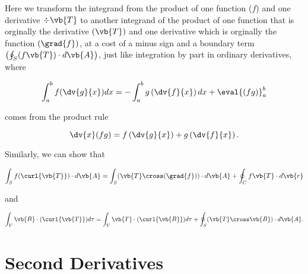 \documentclass[english,a4paper,12pt]{report}
\begin{document}
Here we transform the integrand from the product of one function (\(f\)) and one derivative \(\div{\vb{T}}\) to another integrand of the product of one function that is orginally the derivative \((\vb{T})\) and one derivative which is orginally the function \((\grad{f})\), at a cost of a minus sign and a boundary term \(\left(\oint_{S} (f\vb{T}) \cdot d\vb{A}\right)\), just like integration by part in ordinary derivatives, where
	
\begin{equation} 
	\int_{a}^{b} f(\dv{g}{x})dx = -\int_{a}^{b} g\left(\dv{f}{x}\right)dx + \eval{\left(fg\right)}_a^b 
\end{equation}
	
comes from the product rule
	
\begin{equation} 
	\dv{x}(fg) = f\left(\dv{g}{x}\right) + g\left(\dv{f}{x}\right). 
\end{equation}

Similarly, we can show that 
	
\begin{equation} 
	\int_{S} f(\curl{\vb{T}}) \cdot d\vb{A} = \int_{S} (\vb{T} \cross (\grad{f})) \cdot d\vb{A} + \oint_{C} f\vb{T} \cdot d\vb{r} 
\end{equation}
	
and

\begin{equation} 
	\int_{V} \vb{B} \cdot (\curl{\vb{T}}) d\tau = \int_{V} \vb{T} \cdot (\curl{\vb{B}}) d\tau + \oint_{S} (\vb{T} \cross \vb{B}) \cdot d\vb{A}. 
\end{equation}
	
\section{Second Derivatives}
	
\end{document}
